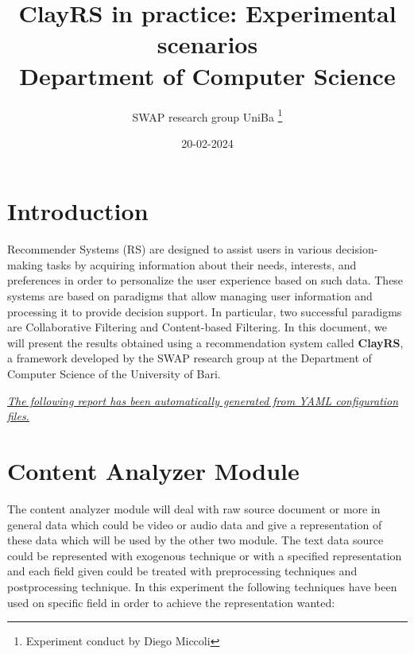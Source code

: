 \documentclass[11pt]{article}
\title{\textbf{ ClayRS in practice: Experimental scenarios }\\ [1cm] Department of Computer Science}
\author{ SWAP research group UniBa \thanks{Experiment conduct by Diego Miccoli}}
\date{20-02-2024}
\begin{document}
\maketitle

\section{Introduction}\label{sec:intro}
Recommender Systems (RS) are designed to assist users in various decision-making tasks by acquiring
information about their needs, interests, and preferences in order to personalize the user experience
based on such data.
These systems are based on paradigms that allow managing user information and processing
it to provide decision support.
In particular, two successful paradigms are Collaborative Filtering and Content-based Filtering.
In this document, we will present the results obtained using a recommendation system called \textbf{ClayRS},
a framework developed by the SWAP research group at the Department of Computer Science of the University of Bari.\\
\hfill\break

\textit{\ul{The following report has been automatically generated from YAML configuration files.}}

\hfill\break




\section{Content Analyzer Module}\label{sec:ca}
The content analyzer module will deal with raw source document or more in general data which could be
video or audio data and give a representation of these data which will be used by the other two module.
The text data source could be represented with exogenous technique or with a specified representation
and each field given could be treated with preprocessing techniques and postprocessing technique.
In this experiment the following techniques have been used on specific field in order to achieve the
representation wanted:
\hfill\break
\hfill\break
\end{document}
